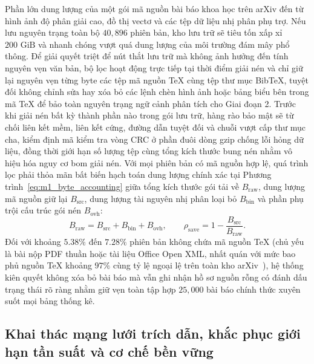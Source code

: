 Phần lớn dung lượng của một gói mã nguồn bài báo khoa học trên arXiv đến từ hình ảnh độ phân giải cao, đồ thị vectơ và các tệp dữ liệu nhị phân phụ trợ. Nếu lưu nguyên trạng toàn bộ $40{,}896$ phiên bản, kho lưu trữ sẽ tiêu tốn xấp xỉ $200\text{ GiB}$ và nhanh chóng vượt quá dung lượng của môi trường đám mây phổ thông. Để giải quyết triệt để nút thắt lưu trữ mà không ảnh hưởng đến tính nguyên vẹn văn bản, bộ lọc hoạt động trực tiếp tại thời điểm giải nén và chỉ giữ lại nguyên vẹn từng byte các tệp mã nguồn TeX cùng tệp thư mục BibTeX, tuyệt đối không chỉnh sửa hay xóa bỏ các lệnh chèn hình ảnh hoặc bảng biểu bên trong mã TeX để bảo toàn nguyên trạng ngữ cảnh phân tích cho Giai đoạn 2. Trước khi giải nén bất kỳ thành phần nào trong gói lưu trữ, hàng rào bảo mật sẽ từ chối liên kết mềm, liên kết cứng, đường dẫn tuyệt đối và chuỗi vượt cấp thư mục cha, kiểm định mã kiểm tra vòng CRC ở phần đuôi dòng gzip chống lỗi hỏng dữ liệu, đồng thời giới hạn số lượng tệp cùng tổng kích thước bung nén nhằm vô hiệu hóa nguy cơ bom giải nén. Với mọi phiên bản có mã nguồn hợp lệ, quá trình lọc phải thỏa mãn bất biến hạch toán dung lượng chính xác tại Phương trình~\eqref{eq:m1_byte_accounting} giữa tổng kích thước gói tải về $B_{\text{raw}}$, dung lượng mã nguồn giữ lại $B_{\text{src}}$, dung lượng tài nguyên nhị phân loại bỏ $B_{\text{bin}}$ và phần phụ trội cấu trúc gói nén $B_{\text{ovh}}$:
\begin{equation}
    B_{\text{raw}} = B_{\text{src}} + B_{\text{bin}} + B_{\text{ovh}}, \qquad
    \rho_{\text{save}} = 1 - \frac{B_{\text{src}}}{B_{\text{raw}}}.
    \label{eq:m1_byte_accounting}
\end{equation}
Đối với khoảng $5.38\%$ đến $7.28\%$ phiên bản không chứa mã nguồn TeX (chủ yếu là bài nộp PDF thuần hoặc tài liệu Office Open XML, nhất quán với mức bao phủ nguồn TeX khoảng $97\%$ cùng tỷ lệ ngoại lệ trên toàn kho arXiv~\cite{ginev2024}), hệ thống kiên quyết không xóa bỏ bài báo mà vẫn ghi nhận hồ sơ nguồn rỗng có đánh dấu trạng thái rõ ràng nhằm giữ vẹn toàn tập hợp $25{,}000$ bài báo chính thức xuyên suốt mọi bảng thống kê.

\subsection{Khai thác mạng lưới trích dẫn, khắc phục giới hạn tần suất và cơ chế bền vững}

